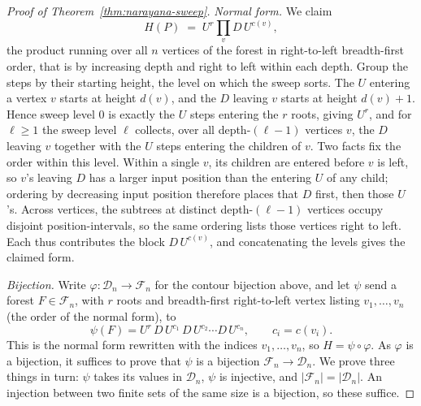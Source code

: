 \documentclass[11pt]{article}
\theoremstyle{definition}
\newcommand{\D}{\mathcal D}
\begin{document}
\begin{proof}[Proof of Theorem~\ref{thm:narayana-sweep}]
\vspace{0.5em}
\noindent\emph{Normal form.}  We claim
\[
   H(P)\;=\;U^{r}\prod_{v}D\,U^{c(v)},
\]
the product running over all $n$ vertices of the forest in right-to-left
breadth-first order, that is by increasing depth and right to left within each
depth.  Group
the steps by their starting height, the level on which the sweep sorts.  The $U$
entering a vertex $v$ starts at height $d(v)$, and the $D$ leaving $v$ starts at
height $d(v)+1$.  Hence sweep level $0$ is exactly the $U$ steps entering the $r$
roots, giving $U^{r}$, and for $\ell\ge 1$ the sweep level $\ell$ collects, over
all depth-$(\ell-1)$ vertices $v$, the $D$ leaving $v$ together with the $U$
steps entering the children of $v$.  Two facts fix the order within this level.
Within a single $v$, its children
are entered before $v$ is left, so $v$'s leaving $D$ has a larger input position
than the entering $U$ of any child; ordering by decreasing input position
therefore places that $D$ first, then those $U$'s.  Across vertices, the subtrees
at distinct depth-$(\ell-1)$ vertices occupy disjoint position-intervals, so the
same ordering lists those vertices right to left.  Each thus contributes the
block $D\,U^{c(v)}$, and concatenating the levels gives the claimed form.

\vspace{0.5em}
\noindent\emph{Bijection.}  Write $\varphi\colon\D_n\to\mathcal F_n$ for the contour
bijection above, and let $\psi$ send a forest $F\in\mathcal F_n$, with $r$ roots
and breadth-first right-to-left vertex listing $v_1,\dots,v_n$ (the order of the
normal form), to
\[
   \psi(F)=U^{r}\,D\,U^{c_1}\,D\,U^{c_2}\cdots D\,U^{c_n},
   \qquad c_i=c(v_i).
\]
This is the normal form rewritten with the indices $v_1,\dots,v_n$, so
$H=\psi\circ\varphi$.  As $\varphi$ is a bijection, it suffices to prove that
$\psi$ is a bijection $\mathcal F_n\to\D_n$.  We prove three things in turn:
$\psi$ takes its values in $\D_n$, $\psi$ is injective, and
$|\mathcal F_n|=|\D_n|$.  An injection between two finite sets of the same size
is a bijection, so these suffice.


\end{proof}
\end{document}
